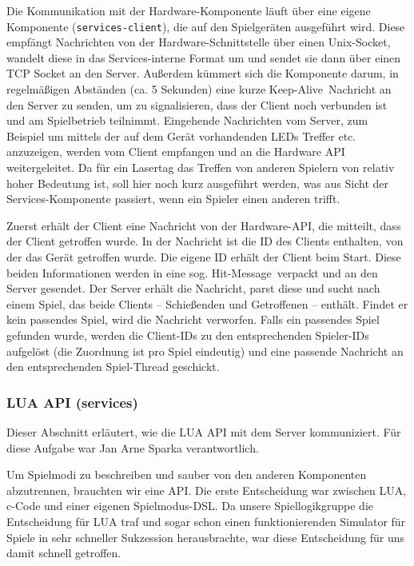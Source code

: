 Die Kommunikation mit der Hardware-Komponente läuft über eine eigene Komponente (\texttt{services-client}), die auf den Spielgeräten ausgeführt wird. Diese empfängt Nachrichten von der Hardware-Schnittstelle über einen Unix-Socket, wandelt diese in das Services-interne Format um und sendet sie dann über einen TCP Socket an den Server. Außerdem kümmert sich die Komponente darum, in regelmäßigen Abständen (ca. 5 Sekunden) eine kurze \glqq Keep-Alive\grqq \, Nachricht an den Server zu senden, um zu signalisieren, dass der Client noch verbunden ist und am Spielbetrieb teilnimmt. 
Eingehende Nachrichten vom Server, zum Beispiel um mittels der auf dem Gerät vorhandenden LEDs Treffer etc. anzuzeigen, werden vom Client empfangen und an die Hardware API weitergeleitet.\newline \newline
Da für ein Lasertag das Treffen von anderen Spielern von relativ hoher Bedeutung ist, soll hier noch kurz ausgeführt werden, was aus Sicht der Services-Komponente passiert, wenn ein Spieler einen anderen trifft.

Zuerst erhält der Client eine Nachricht von der Hardware-API, die mitteilt, dass der Client getroffen wurde. In der Nachricht ist die ID des Clients enthalten, von der das Gerät getroffen wurde. Die eigene ID erhält der Client beim Start. Diese beiden Informationen werden in eine sog. \glqq Hit-Message\grqq \, verpackt und an den Server gesendet. 
Der Server erhält die Nachricht, parst diese und sucht nach einem Spiel, das beide Clients – Schießenden und Getroffenen – enthält. Findet er kein passendes Spiel, wird die Nachricht verworfen. Falls ein passendes Spiel gefunden wurde, werden die Client-IDs zu den entsprechenden Spieler-IDs aufgelöst (die Zuordnung ist pro Spiel eindeutig) und eine passende Nachricht an den entsprechenden Spiel-Thread geschickt.

\subsubsection{LUA API (services)}
\label{sec:services-lua-api}
Dieser Abschnitt erläutert, wie die LUA API mit dem Server kommuniziert. Für diese Aufgabe war Jan Arne Sparka verantwortlich.

Um Spielmodi zu beschreiben und sauber von den anderen Komponenten abzutrennen, brauchten wir eine API. Die erste Entscheidung war zwischen LUA, c-Code und einer eigenen Spielmodus-DSL. Da unsere Spiellogikgruppe die Entscheidung für LUA traf und sogar schon einen funktionierenden Simulator für Spiele in sehr schneller Sukzession herausbrachte, war diese Entscheidung für uns damit schnell getroffen.

